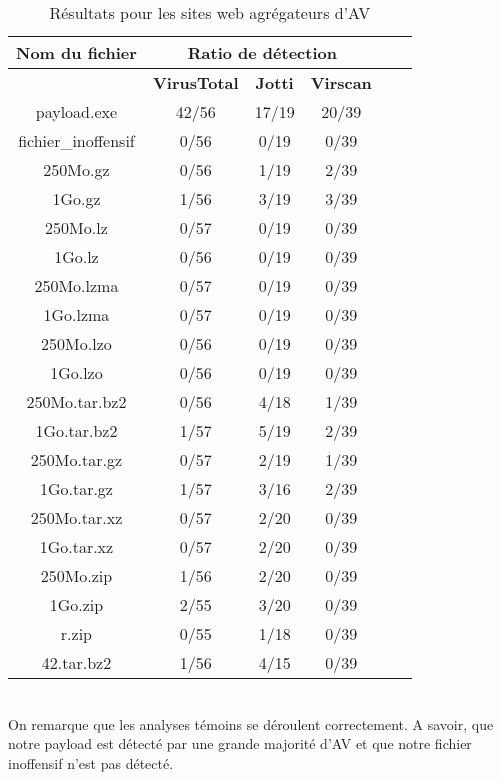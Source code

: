 \documentclass{svjour3}
\begin{document}
\begin{table}[ht!]
\begin{normalsize}
\begin{center}
\begin{tabular}{|*{6}{c|}}
    \hline
    \textbf{Nom du fichier} & \multicolumn{3}{|c|}{\textbf{Ratio de détection}}\\
    \hline
  	 & \textbf{VirusTotal} & \textbf{Jotti} & \textbf{Virscan} \\
	\hline
payload.exe & 42/56 & 17/19 & 20/39\\
	\hline
fichier\_inoffensif & 0/56 & 0/19  & 0/39 \\
	\hline
	\hline
250Mo.gz & 0/56 & 1/19 & 2/39 \\
	\hline
1Go.gz &  1/56 & 3/19 & 3/39\\
    \hline
    \hline
250Mo.lz & 0/57 & 0/19 & 0/39\\
	\hline
1Go.lz & 0/56 & 0/19 & 0/39\\
    \hline
    \hline
250Mo.lzma & 0/57 & 0/19 & 0/39\\
	\hline
1Go.lzma & 0/57 & 0/19 & 0/39\\
    \hline
    \hline
250Mo.lzo & 0/56 & 0/19 & 0/39\\
	\hline
1Go.lzo & 0/56 & 0/19 & 0/39\\
    \hline
    \hline
250Mo.tar.bz2 & 0/56 & 4/18 & 1/39\\
	\hline
1Go.tar.bz2 & 1/57 & 5/19 & 2/39\\
    \hline
    \hline
250Mo.tar.gz & 0/57 & 2/19 & 1/39\\
	\hline
1Go.tar.gz & 1/57 & 3/16 & 2/39\\
    \hline
    \hline
250Mo.tar.xz & 0/57 & 2/20 & 0/39\\
	\hline
1Go.tar.xz & 0/57 & 2/20 & 0/39\\
    \hline
    \hline
250Mo.zip & 1/56 & 2/20 & 0/39\\
	\hline
1Go.zip & 2/55 & 3/20 & 0/39\\
    \hline
    \hline
r.zip & 0/55 & 1/18 & 0/39\\
	\hline
42.tar.bz2 & 1/56 & 4/15 & 0/39\\
	\hline
\end{tabular}
\end{center}
\caption{Résultats pour les sites web agrégateurs d'AV}
\end{normalsize}
\end{table}
\\On remarque que les analyses témoins se déroulent correctement. A savoir, que notre payload est détecté par une grande majorité d'AV et que notre fichier inoffensif n'est pas détecté.\\
\end{document}
